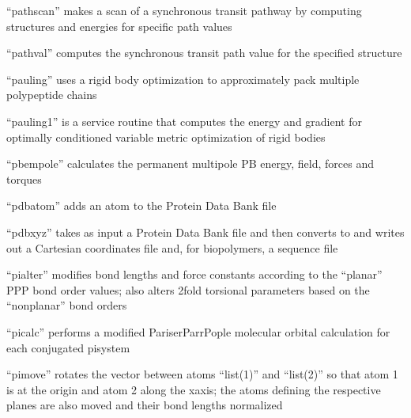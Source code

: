 \documentclass[letterpaper,11pt,english]{sphinxmanual}
\begin{document}
“pathscan” makes a scan of a synchronous transit pathway by
computing structures and energies for specific path values


“pathval” computes the synchronous transit path value for
the specified structure


“pauling” uses a rigid body optimization to approximately
pack multiple polypeptide chains


“pauling1” is a service routine that computes the energy
and gradient for optimally conditioned variable metric
optimization of rigid bodies



“pbempole” calculates the permanent multipole PB energy,
field, forces and torques



“pdbatom” adds an atom to the Protein Data Bank file


“pdbxyz” takes as input a Protein Data Bank file and then
converts to and writes out a Cartesian coordinates file and,
for biopolymers, a sequence file


“pialter” modifies bond lengths and force constants according
to the “planar” P\sphinxhyphen{}P\sphinxhyphen{}P bond order values; also alters 2\sphinxhyphen{}fold
torsional parameters based on the “nonplanar” bond orders


“picalc” performs a modified Pariser\sphinxhyphen{}Parr\sphinxhyphen{}Pople molecular
orbital calculation for each conjugated pisystem


“pimove” rotates the vector between atoms “list(1)” and
“list(2)” so that atom 1 is at the origin and atom 2 along
the x\sphinxhyphen{}axis; the atoms defining the respective planes are
also moved and their bond lengths normalized
\end{document}
